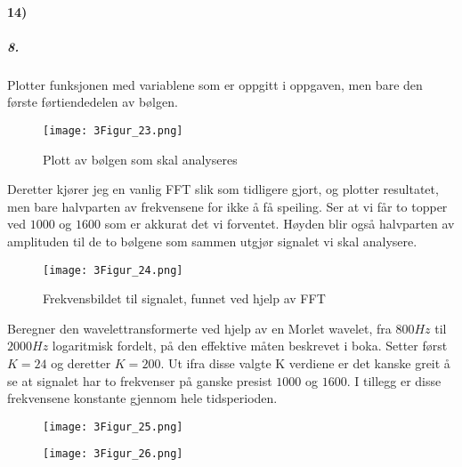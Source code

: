 \documentclass[11pt, A4paper,norsk]{article}
\begin{document}
		\paragraph{14)}
			\subparagraph{8.}
				\begin{flushleft}
Plotter funksjonen med variablene som er oppgitt i oppgaven, men bare den første førtiendedelen av bølgen.
				\end{flushleft}
				\begin{figure}[H]
\texttt{[image: 3Figur\_23.png]} \\
\caption{Plott av bølgen som skal analyseres}
				\end{figure}




				\begin{flushleft}
Deretter kjører jeg en vanlig FFT slik som tidligere gjort, og plotter resultatet, men bare halvparten av frekvensene for ikke å få speiling. Ser at vi får to topper ved $1000$ og $1600$ som er akkurat det vi forventet. Høyden blir også halvparten av amplituden til de to bølgene som sammen utgjør signalet vi skal analysere.
				\end{flushleft}
				\begin{figure}[H]
\texttt{[image: 3Figur\_24.png]} \\
\caption{Frekvensbildet til signalet, funnet ved hjelp av FFT}
				\end{figure}






				\begin{flushleft}
Beregner den wavelettransformerte ved hjelp av en Morlet wavelet, fra $800 Hz$ til $2000 Hz$ logaritmisk fordelt, på den effektive måten beskrevet i boka. Setter først $K = 24$ og deretter $K = 200$. Ut ifra disse valgte K verdiene er det kanske greit å se at signalet har to frekvenser på ganske presist $1000$ og $1600$. I tillegg er disse frekvensene konstante gjennom hele tidsperioden.
				\end{flushleft}
				\begin{figure}[H]
\texttt{[image: 3Figur\_25.png]}
				\end{figure}
				\begin{figure}[H]
\texttt{[image: 3Figur\_26.png]}
				\end{figure}
\end{document}
